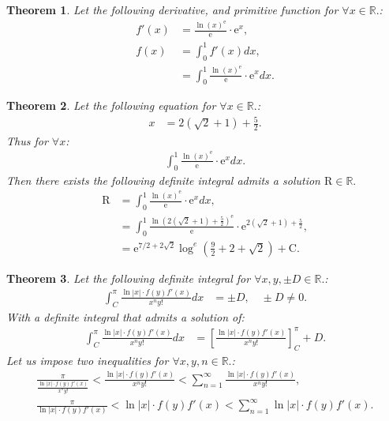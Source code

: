 \documentclass[10pt]{article}
\theoremstyle{plain}
\newtheorem{theorem}{Theorem}[section]
\theoremstyle{definition}
\theoremstyle{remark}
\begin{document}
\begin{theorem}
	Let the following derivative, and primitive function for $\forall x \in \mathbb{R}.$:
	\begin{align*}
		f'(x)&= \frac{\ln (x)^{\mathrm{e}}}{\mathrm{e}} \cdot \mathrm{e}^{x},\\
		f(x) &= \int_{0}^{1} f'(x)dx,\\
		&= \int_{0}^{1} \frac{\ln (x)^{\mathrm{e}}}{\mathrm{e}} \cdot \mathrm{e}^{x} dx.
	\end{align*}
\end{theorem}

\begin{theorem}
	Let the following equation for $\forall x \in \mathbb{R}.$:
	\begin{align*}
		x &= 2(\sqrt{2} + 1) + \frac{5}{2}.
	\end{align*}
	Thus for $\forall x$:
	\begin{align*}
		\int_{0}^{1} \frac{\ln (x)^{\mathrm{e}}}{\mathrm{e}} \cdot \mathrm{e}^{x} dx.
	\end{align*}
	Then there exists the following definite integral admits a solution $\mathrm{R} \in \mathbb{R}.$
	\begin{align*}
		\mathrm{R} &= \int_{0}^{1} \frac{\ln (x)^{\mathrm{e}}}{\mathrm{e}} \cdot \mathrm{e}^{x} dx,\\
		&= \int_{0}^{1} \frac{\ln (2(\sqrt{2} + 1) + \frac{5}{2})^{\mathrm{e}}}{\mathrm{e}} \cdot \mathrm{e}^{2(\sqrt{2} + 1) + \frac{5}{2}},\\
		&= \mathrm{e}^{7/2+2 \sqrt{2}} \log^{e}(\frac{9}{2}+2+\sqrt{2}) + \mathrm{C}.
	\end{align*}
\end{theorem}

\begin{theorem}
	Let the following definite integral for $\forall x, y, \pm D \in \mathbb{R}.$:
	\begin{align*}
		\int_{C}^{\pi} \frac{ \ln |x| \cdot f(y)f'(x) }{x^{n}y!} dx &= \pm D, \quad \pm D \neq 0.
	\end{align*}
	With a definite integral that admits a solution of:
	\begin{align*}
		\int_{C}^{\pi} \frac{ \ln |x| \cdot f(y)f'(x) }{x^{n}y!} dx &= [\frac{ \ln |x| \cdot f(y)f'(x) }{x^{n}y!}]_{C}^{\pi} + D.
	\end{align*}
	Let us impose two inequalities for $\forall x, y, n \in \mathbb{R}.$:
	\begin{align*}
		\frac{\pi}{\frac{ \ln |x| \cdot f(y)f'(x) }{x^{n}y!}} < \frac{ \ln |x| \cdot f(y)f'(x) }{x^{n}y!} < \sum_{n=1}^{\infty} \frac{ \ln |x| \cdot f(y)f'(x) }{x^{n}y!},\\
	\frac{\pi}{\ln |x| \cdot f(y)f'(x) } < \ln |x| \cdot f(y)f'(x)  < \sum_{n=1}^{\infty} \ln |x| \cdot f(y)f'(x).
	\end{align*}
\end{theorem}
\end{document}
